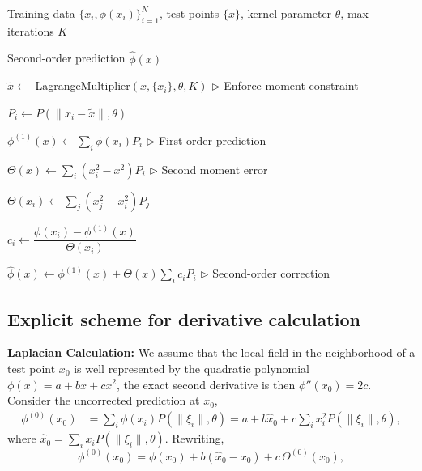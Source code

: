 \documentclass{article} %
\theoremstyle{plain}
\begin{document}
\begin{algorithm}[H]
\caption{Exact second-order correction KBR}
\label{alg:kbr_explicit}
\begin{algorithmic}[1]

\Require Training data $\{x_i,\phi(x_i)\}_{i=1}^N$, test points $\{x\}$, kernel parameter $\theta$, max iterations $K$

\Ensure Second-order prediction $\hat{\phi}(x)$


    \State $\tilde{x} \leftarrow$ LagrangeMultiplier$(x,\{x_i\},\theta,K)$  \hfill $\triangleright$ Enforce moment constraint

        \State $P_i \leftarrow P(\|x_i-\tilde{x}\|,\theta)$
    \EndFor

    \State $\phi^{(1)}(x) \leftarrow \sum_i \phi(x_i)P_i$  \hfill $\triangleright$ First-order prediction

    \State $\Theta(x) \leftarrow \sum_i (x_i^2-x^2)P_i$  \hfill $\triangleright$ Second moment error

        \State $\Theta(x_i) \leftarrow \sum_j (x_j^2-x_i^2)P_j$
    \EndFor

        \State $c_i \leftarrow \dfrac{\phi(x_i)-\phi^{(1)}(x)}{\Theta(x_i)}$
    \EndFor

    \State $\hat{\phi}(x) \leftarrow \phi^{(1)}(x)+\Theta(x)\sum_i c_i P_i$  \hfill $\triangleright$ Second-order correction

\EndFor

\end{algorithmic}
\end{algorithm}


\subsection{Explicit scheme for derivative calculation}
\label{asec:explicit}

\textbf{Laplacian Calculation:}
We assume that the local field in the neighborhood of a test point $x_0$
is well represented by the quadratic polynomial $\phi(x) = a + bx + cx^2$, the exact second derivative is then $\phi''(x_0)=2c$. Consider the uncorrected prediction at $x_0$,
\begin{align}
\phi^{(0)}(x_0)
&= \sum_i \phi(x_i) P(\|\xi_i\|,\theta)
= a + b \hat{x}_0 + c \sum_i x_i^2 P(\|\xi_i\|,\theta),
\end{align}
where $\hat{x}_0=\sum_i x_i P(\|\xi_i\|,\theta)$.
Rewriting,
\begin{equation}
\phi^{(0)}(x_0)
=
\phi(x_0)
+
b(\hat{x}_0-x_0)
+
c\,\Theta^{(0)}(x_0),
\end{equation}
\end{document}
